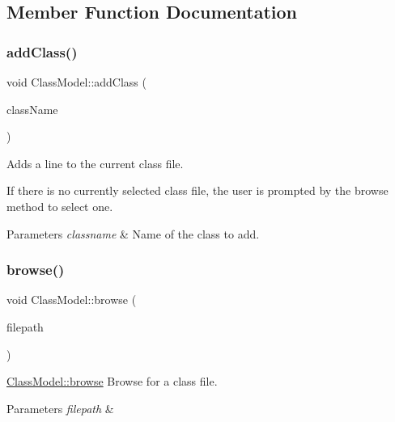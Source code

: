 \subsection{Member Function Documentation}
\mbox{\label{classClassModel_ab96bae16ed8f02abf2eca0d7b89a8a62}} 
\subsubsection{\texorpdfstring{add\+Class()}{addClass()}}
{\footnotesize\ttfamily void Class\+Model\+::add\+Class (\begin{DoxyParamCaption}\item[{Q\+String}]{class\+Name }\end{DoxyParamCaption})}



Adds a line to the current class file. 

If there is no currently selected class file, the user is prompted by the browse method to select one.


\begin{DoxyParams}{Parameters}
{\em classname} & Name of the class to add. \\
\hline
\end{DoxyParams}
\mbox{\label{classClassModel_a1fb7006db6a2aab398a7c82cab2da568}} 
\subsubsection{\texorpdfstring{browse()}{browse()}}
{\footnotesize\ttfamily void Class\+Model\+::browse (\begin{DoxyParamCaption}\item[{const Q\+String \&}]{filepath }\end{DoxyParamCaption})}



\hyperlink{classClassModel_a275d7d723cceff7cddea637e29bb5489}{Class\+Model\+::browse} Browse for a class file. 


\begin{DoxyParams}{Parameters}
{\em filepath} & \\
\hline
\end{DoxyParams}
\mbox{\label{classClassModel_ad2e5262948d7491cf1f8bfd305dff829}} 
